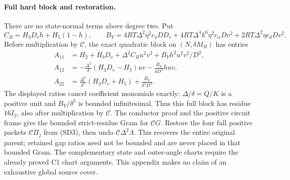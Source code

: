 \paragraph{Full hard block and restoration.}
There are no state-normal terms above degree two. Put
\[
 C_B=H_3D_vh+H_5(1-h),\qquad
 B_Y=4RT\Delta^2\eta^2c_4DD_v
 +4RT\Delta^4k^6\eta^2c_\alpha Dv^2
 +2RT\Delta^2\eta c_dDv^2.
\]
Before multiplication by $\mathcal C$, the exact quadratic block on
$(N,\delta M_B)$ has entries
\begin{align*}
 A_{11}&=H_2+H_bD_v+\Delta^2C_Bu^2v^2+B_Yh^2u^2v^2/D^2,\\
 A_{12}&=-\frac{\Delta^2}{\delta}(H_3D_v-H_5)uv
                  -\frac{B_Y}{\delta D^2}huv,\\
 A_{22}&=\frac{\Delta^2}{\delta^2}(H_3D_v+H_5)
                  +\frac{B_Y}{\delta^2D^2}.
\end{align*}
The displayed ratios cancel coefficient monomials exactly:
$\Delta/\delta=Q/K$ is a positive unit and
$B_Y/\delta^2$ is bounded infinitesimal. Thus this full block has
residue $16I_2$, also after multiplication by $\mathcal C$.
The conductor proof and the positive circuit frame give the bounded
strict-residue Gram for $\mathcal CG$. Restore the four full positive
packets $\mathcal C\Pi_j$ from (SD3), then undo
$\mathcal C\Delta^2\Lambda$. This recovers the entire original parent;
retained gap ratios need not be bounded and are never placed in that
bounded Gram. The complementary state and outer-angle charts require
the already proved C1 chart arguments. This appendix makes no claim of
an exhaustive global source cover.
